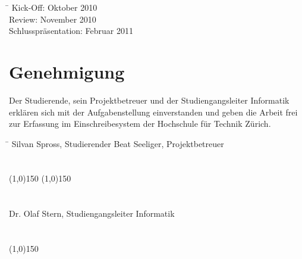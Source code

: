 \documentclass[]{scrreprt}
\begin{document}
    \begin{tabbing}
        \hspace*{4cm}\= \kill
    	Kick-Off:               \> Oktober 2010 \\
    	Review:                 \> November 2010 \\
    	Schlusspräsentation:    \> Februar 2011 \\
    \end{tabbing}

    \section{Genehmigung}
    Der Studierende, sein Projektbetreuer und der Studiengangsleiter 
    Informatik erklären sich mit der Aufgabenstellung einverstanden und geben 
    die Arbeit frei zur Erfassung im Einschreibesystem der Hochschule für 
    Technik Zürich.

    \begin{tabbing}
        \hspace*{10cm}\= \kill
    	Silvan Spross, Studierender \> Beat Seeliger, Projektbetreuer \\\\\\
        \line(1,0){150} \> \line(1,0){150} \\\\\\
    	Dr. Olaf Stern, Studiengangsleiter Informatik \\\\\\
        \line(1,0){150}
    \end{tabbing}

    
    
    
\end{document}
